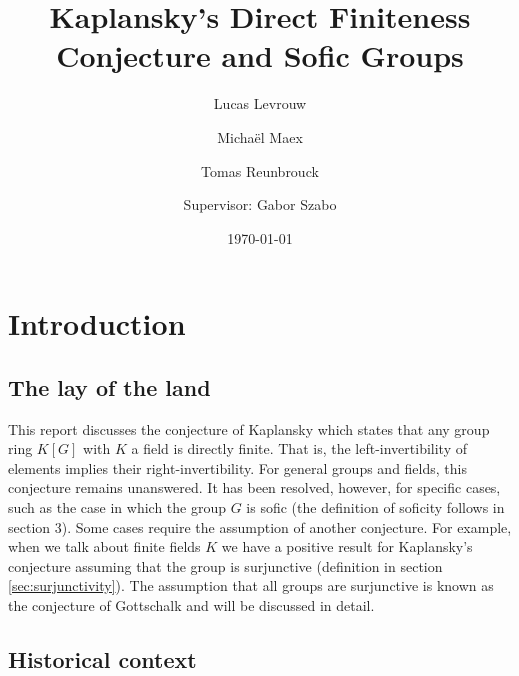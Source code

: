 \documentclass[titlepage, a4paper]{article}
\author{Lucas Levrouw \and Michaël Maex \and Tomas Reunbrouck \and Supervisor: Gabor Szabo}
\title{Kaplansky's Direct Finiteness Conjecture and Sofic Groups}
\date{\today}
\theoremstyle{remark}
\begin{document}
    \maketitle
{}
\tableofcontents
\pagebreak

\section{Introduction}\label{sec:intro}

\subsection*{The lay of the land}

This report discusses the conjecture of Kaplansky which states that any group ring $K[G]$ with $K$ a field is directly finite. That is, the left-invertibility of elements implies their right-invertibility. For general groups and fields, this conjecture remains unanswered. It has been resolved, however, for specific cases, such as the case in which the group $G$ is sofic (the definition of soficity follows in section 3). Some cases require the assumption of another conjecture. For example, when we talk about finite fields $K$ we have a positive result for Kaplansky’s conjecture assuming that the group is surjunctive (definition in section \ref{sec:surjunctivity}).
The assumption that all groups are surjunctive is known as the conjecture of Gottschalk and will be discussed in detail.

\subsection*{Historical context}
\end{document}
